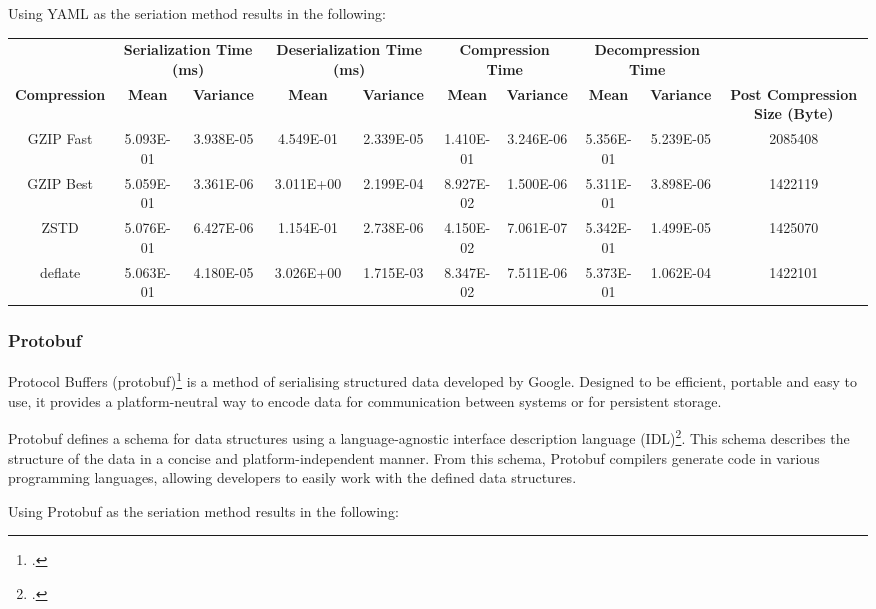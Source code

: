 Using YAML as the seriation method results in the following:

\begin{table}[H]
\centering
\begin{tabular}{cccccccccc}
\hline
 &
  \multicolumn{2}{c}{\textbf{Serialization Time (ms)}} &
  \multicolumn{2}{c}{\textbf{Deserialization Time (ms)}} &
  \multicolumn{2}{c}{\textbf{Compression Time}} &
  \multicolumn{2}{c}{\textbf{Decompression Time}} &
   \\
\textbf{Compression} & \textbf{Mean}     & \textbf{Variance} & \textbf{Mean}     & \textbf{Variance} & \textbf{Mean}     & \textbf{Variance} & \textbf{Mean}     & \textbf{Variance} & \textbf{Post Compression Size (Byte)} \\
\hline
GZIP Fast           & 5.093E-01 & 3.938E-05 & 4.549E-01 & 2.339E-05 & 1.410E-01 & 3.246E-06 & 5.356E-01 & 5.239E-05 & 2085408 \\
GZIP Best           & 5.059E-01 & 3.361E-06 & 3.011E+00 & 2.199E-04 & 8.927E-02 & 1.500E-06 & 5.311E-01 & 3.898E-06 & 1422119 \\
ZSTD                & 5.076E-01 & 6.427E-06 & 1.154E-01 & 2.738E-06 & 4.150E-02 & 7.061E-07 & 5.342E-01 & 1.499E-05 & 1425070 \\
deflate             & 5.063E-01 & 4.180E-05 & 3.026E+00 & 1.715E-03 & 8.347E-02 & 7.511E-06 & 5.373E-01 & 1.062E-04 & 1422101 \\
\hline
\end{tabular}
\end{table}

\subsubsection{Protobuf}
Protocol Buffers (protobuf)\footcite{protobuf} is a method of serialising structured data developed by Google. Designed to be efficient, portable and easy to use, it provides a platform-neutral way to encode data for communication between systems or for persistent storage.

Protobuf defines a schema for data structures using a language-agnostic interface description language (IDL)\footcite{idl}. This schema describes the structure of the data in a concise and platform-independent manner. From this schema, Protobuf compilers generate code in various programming languages, allowing developers to easily work with the defined data structures.

Using Protobuf as the seriation method results in the following:

